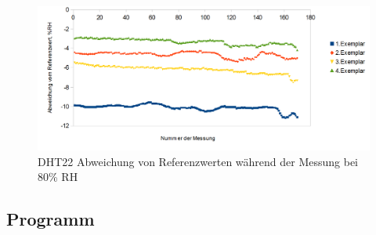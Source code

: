 \documentclass[runningheads]{llncs}
\begin{document}
\begin{figure}[h]
\includegraphics[width=\textwidth]{pictures/DHT22_80.png}
\caption{DHT22 Abweichung von Referenzwerten während der Messung bei 80\% RH}
\end{figure}

\clearpage

\subsection{Programm}
\end{document}
